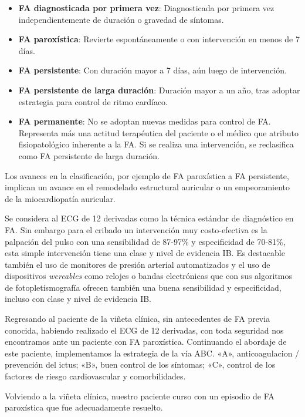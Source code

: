 \documentclass[a4paper]{article}
\let\cite=\supercite
\begin{document}
\begin{multicols}{3}
\begin{itemize}
    \item \footnotesize{\textbf{FA diagnosticada por primera vez}: Diagnosticada por primera vez independientemente de duración o gravedad de síntomas.}
    \item \textbf{FA paroxística}: Revierte espontáneamente o con intervención en menos de 7 días.
    \item \textbf{FA persistente}: Con duración mayor a 7 días, aún luego de intervención.
		\item \textbf{FA persistente de larga duración}: Duración mayor a un año, tras adoptar estrategia para control de ritmo cardíaco.
		\item \textbf{FA permanente}: No se adoptan nuevas medidas para control de FA. Representa más una actitud terapéutica del paciente o el médico que atributo fisiopatológico inherente a la FA. Si se realiza una intervención, se reclasifica como FA persistente de larga duración.
\end{itemize}

Los avances en la clasificación, por ejemplo de FA paroxística a FA persistente,
implican un avance en el remodelado estructural auricular o un empeoramiento
de la miocardiopatía auricular.

Se considera al ECG de 12 derivadas como la técnica estándar de diagnóstico en
FA\cite{mairesse2017}. Sin embargo para el cribado un intervención muy
costo-efectiva es la palpación del pulso con una sensibilidad de 87-97\% y
especificidad de 70-81\%, esta simple intervención tiene una clase y nivel de
evidencia IB. Es destacable también el uso de monitores de presión arterial
automatizados y el uso de dispositivos \emph{wereables} como relojes o bandas
electrónicas que con sus algoritmos de fotopletismografía ofrecen también una
buena sensibilidad y especificidad, incluso con clase y nivel de evidencia
IB\cite{guiaesc_2021}.

Regresando al paciente de la viñeta clínica, sin antecedentes de FA previa
conocida, habiendo realizado el ECG de 12 derivadas, con toda seguridad nos
encontramos ante un paciente con FA paroxística. Continuando el abordaje de
este paciente, implementamos la estrategia de la vía ABC\cite{lip_abc_2017}.
«A», anticoagulacion / prevención del ictus; «B», buen control de los síntomas;
«C», control de los factores de riesgo cardiovascular y comorbilidades.

Volviendo a la viñeta clínica, nuestro paciente curso con un episodio de FA
paroxística que fue adecuadamente resuelto.

\closearticle

\printbibliography[heading=none]

\closearticle

\end{multicols}
\end{document}
